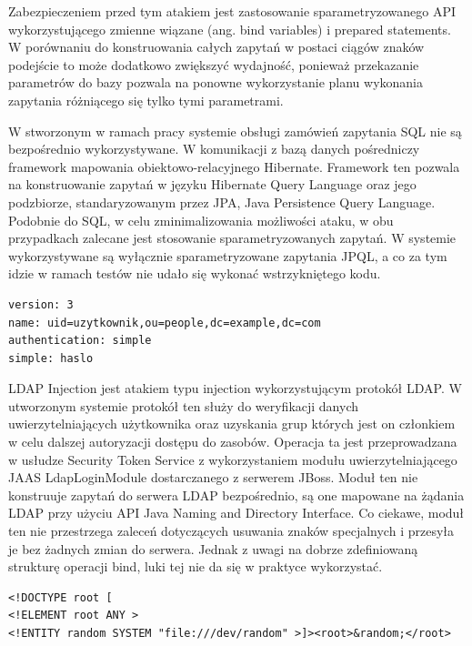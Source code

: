 	Zabezpieczeniem przed tym atakiem jest zastosowanie sparametryzowanego API wykorzystującego zmienne wiązane (ang. bind variables) i prepared statements\cite{BindVariables}. W porównaniu do konstruowania całych zapytań w postaci ciągów znaków podejście to może dodatkowo zwiększyć wydajność, ponieważ przekazanie parametrów do bazy pozwala na ponowne wykorzystanie planu wykonania zapytania różniącego się tylko tymi parametrami.

	W stworzonym w ramach pracy systemie obsługi zamówień  zapytania SQL nie są bezpośrednio wykorzystywane. W komunikacji z bazą danych pośredniczy framework mapowania obiektowo-relacyjnego Hibernate. Framework ten pozwala na konstruowanie zapytań w języku Hibernate Query Language oraz jego podzbiorze, standaryzowanym przez JPA, Java Persistence Query Language. Podobnie do SQL, w celu zminimalizowania możliwości ataku, w obu przypadkach zalecane jest stosowanie sparametryzowanych zapytań. W systemie wykorzystywane są wyłącznie sparametryzowane zapytania JPQL, a co za tym idzie w ramach testów nie udało się wykonać wstrzykniętego kodu.
	
	\begin{lstlisting}
version: 3
name: uid=uzytkownik,ou=people,dc=example,dc=com
authentication: simple
simple: haslo
	\end{lstlisting}
	
	LDAP Injection jest atakiem typu injection wykorzystującym protokół LDAP. W utworzonym systemie protokół ten służy do weryfikacji danych uwierzytelniających użytkownika oraz uzyskania grup których jest on członkiem w celu dalszej autoryzacji dostępu do zasobów.  Operacja ta jest przeprowadzana w usłudze Security Token Service z wykorzystaniem modułu uwierzytelniającego JAAS LdapLoginModule dostarczanego z serwerem JBoss. Moduł ten nie konstruuje zapytań do serwera LDAP bezpośrednio, są one mapowane na żądania LDAP przy użyciu API Java Naming and Directory Interface. Co ciekawe, moduł ten nie przestrzega zaleceń dotyczących usuwania znaków specjalnych i przesyła je bez żadnych zmian do serwera. Jednak z uwagi na dobrze zdefiniowaną strukturę operacji bind, luki tej nie da się w praktyce wykorzystać. 
	
	\begin{lstlisting}
<!DOCTYPE root [  
<!ELEMENT root ANY >
<!ENTITY random SYSTEM "file:///dev/random" >]><root>&random;</root>
	\end{lstlisting}
	
